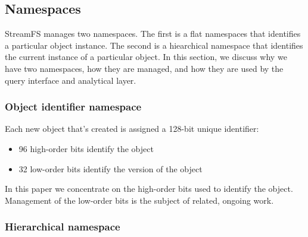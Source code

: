\subsection{Namespaces}
StreamFS manages two namespaces.  The first is a flat namespaces that identifies a particular
object instance.  The second is a hiearchical namespace that identifies the current instance
of a particular object.  In this section, we discuss why we have two namespaces, how
they are managed, and how they are used by the query interface and analytical layer.

\subsubsection{Object identifier namespace}
Each new object that's created is assigned a 128-bit unique identifier:

\begin{itemize}
\item 96 high-order bits identify the object
\item 32 low-order bits identify the version of the object
\end{itemize}

In this paper we concentrate on the high-order bits used to identify the object.  Management of the low-order
bits is the subject of related, ongoing work.

\subsubsection{Hierarchical namespace}